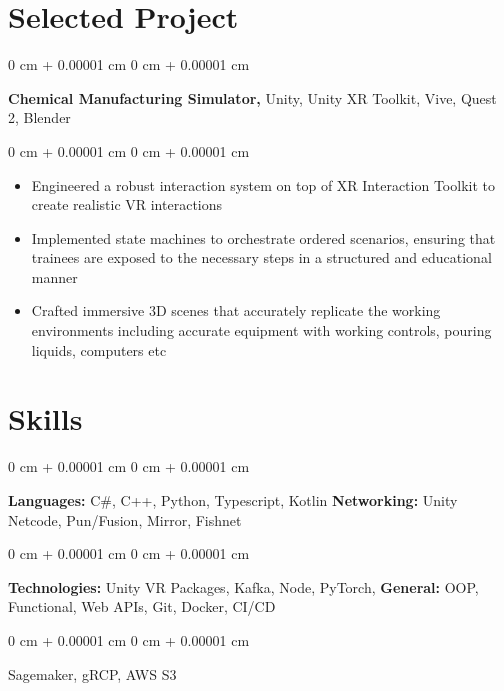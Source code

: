 \documentclass[10pt, letterpaper]{article}
\newenvironment{highlights}{
    \begin{itemize}[
        topsep=0.10 cm,
        parsep=0.10 cm,
        partopsep=0pt,
        itemsep=0pt,
        leftmargin=0 cm + 10pt
    ]
}{
    \end{itemize}
} %
\newenvironment{onecolentry}{
    \begin{adjustwidth}{
        0 cm + 0.00001 cm
    }{
        0 cm + 0.00001 cm
    }
}{
    \end{adjustwidth}
} %
\begin{document}
    \section{Selected Project}
        \begin{onecolentry}
        \textbf{Chemical Manufacturing Simulator,} Unity, Unity XR Toolkit, Vive, Quest 2, Blender 
        \end{onecolentry}

        \vspace{0.10 cm}
        \begin{onecolentry}
            \begin{highlights}
                \item Engineered a robust interaction system on top of XR Interaction Toolkit to create realistic VR interactions 
                \item Implemented state machines to orchestrate ordered scenarios, ensuring that trainees are exposed to the necessary steps in a structured and educational manner
                \item  Crafted immersive 3D scenes that accurately replicate the working environments including accurate equipment with working controls, pouring liquids, computers etc
            \end{highlights}
        \end{onecolentry}

    \section{Skills}
        \begin{onecolentry}
            \textbf{Languages:} C\#, C++, Python, Typescript, Kotlin     \hspace{2cm}    \textbf{Networking:} Unity Netcode, Pun/Fusion, Mirror, Fishnet
        \end{onecolentry}

        \vspace{0.1 cm}

        \begin{onecolentry}
            \textbf{Technologies:} Unity VR Packages, Kafka, Node, PyTorch, \hspace{0.8cm} \textbf{General:} OOP, Functional, Web APIs, Git, Docker, CI/CD 
        \end{onecolentry}

         \begin{onecolentry}
            Sagemaker, gRCP, AWS S3
         \end{onecolentry}
\end{document}
